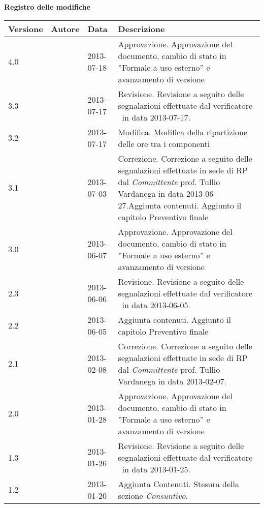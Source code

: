 \Large{\textbf{Registro delle modifiche}}\\
\normalsize
\label{tabVers1}
\begin{longtable}{p{} p{} p{} p{}}
\toprule
\textbf{Versione}	&	\textbf{Autore}	&	\textbf{Data}	&	\textbf{Descrizione}\\
\midrule


\midrule
4.0	&	\MB &	2013-07-18 	&	Approvazione.\newline
						Approvazione del documento, cambio di stato in ”Formale a uso esterno” e avanzamento di versione\\
\midrule
3.3	&	\DC &	2013-07-17	&	Revisione.\newline
						Revisione a seguito delle segnalazioni effettuate dal verificatore \EZ~in data 2013-07-17.\\

\midrule
3.2	&	\DC &	2013-07-17	&	Modifica.\newline
						 Modifica della ripartizione delle ore tra i componenti\\	
\midrule
3.1	&	\DC &	2013-07-03 	&	Correzione.\newline
						Correzione a seguito delle segnalazioni effettuate in sede di RP dal \textit{Committente} prof. Tullio Vardanega in data 2013-06-27.\newline Aggiunta contenuti.\newline
						Aggiunto il capitolo Preventivo finale\\
\midrule
3.0	&	\FZ &	2013-06-07 	&	Approvazione.\newline
						Approvazione del documento, cambio di stato in ”Formale a uso esterno” e avanzamento di versione\\
\midrule
2.3	&	\EZ &	2013-06-06	&	Revisione.\newline
						Revisione a seguito delle segnalazioni effettuate dal verificatore \SL~in data 2013-06-05.\\
\midrule
2.2	&	\EZ &	2013-06-05 	&	Aggiunta contenuti.\newline
						Aggiunto il capitolo Preventivo finale\\
\midrule
2.1	&	\EZ &	2013-02-08 	&	Correzione.\newline
						Correzione a seguito delle segnalazioni effettuate in sede di RP dal \textit{Committente} prof. Tullio Vardanega in data 2013-02-07.\\
\midrule
2.0	&	\DC &	2013-01-28 	&	Approvazione.\newline
						Approvazione del documento, cambio di stato in ”Formale a uso esterno” e avanzamento di versione\\
\midrule
1.3	&	\FZ &	2013-01-26	&	Revisione.\newline
						Revisione a seguito delle segnalazioni effettuate dal verificatore \FZ~in data 2013-01-25.\\
\midrule
1.2	&	\SL &	2013-01-20 	&	Aggiunta Contenuti.\newline
						Stesura della sezione \emph{Consuntivo}.\\


\end{longtable}
